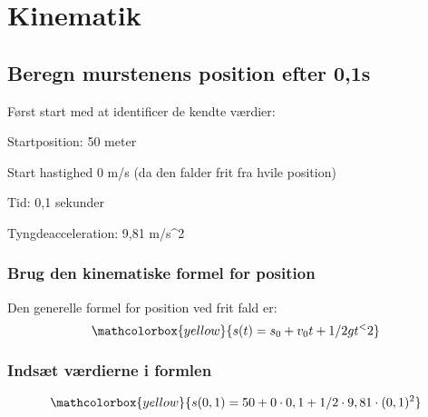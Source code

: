\section{Kinematik}
\subsection{Beregn murstenens position efter 0,1s}
Først start med at identificer de kendte værdier:
\item Startposition: 50 meter
\item Start hastighed 0 m/s (da den falder frit fra hvile position)
\item Tid: 0,1 sekunder
\item Tyngdeacceleration: 9,81 m/s^2 

\subsubsection{Brug den kinematiske formel for position}
Den generelle formel for position ved frit fald er:
\begin{equation*}
    \mathcolorbox{yellow}{s(t)=s_0+v_0t+1/2gt^<{2}}
\end{equation*}

\subsubsection{Indsæt værdierne i formlen}
\begin{equation*}
    \mathcolorbox{yellow}{s(0,1)=50+0\cdot0,1+1/2\cdot9,81\cdot(0,1)^{2}}
\end{equation*}